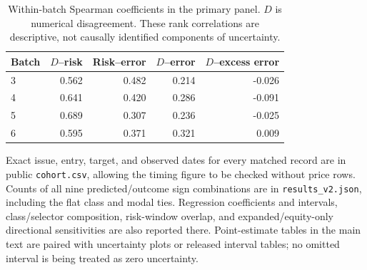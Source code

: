 \begin{table}[H]\centering\small

\begin{tabular}{lrrrr}\toprule

Batch & $D$--risk & Risk--error & $D$--error & $D$--excess error\\\midrule

3 & 0.562 & 0.482 & 0.214 & -0.026\\

4 & 0.641 & 0.420 & 0.286 & -0.091\\

5 & 0.689 & 0.307 & 0.236 & -0.025\\

6 & 0.595 & 0.371 & 0.321 & 0.009\\

\bottomrule\end{tabular}

\caption{Within-batch Spearman coefficients in the primary panel. $D$ is numerical disagreement. These rank correlations are descriptive, not causally identified components of uncertainty.}\end{table}

Exact issue, entry, target, and observed dates for every matched record are in public \texttt{cohort.csv}, allowing the timing figure to be checked without price rows. Counts of all nine predicted/outcome sign combinations are in \texttt{results\_v2.json}, including the flat class and modal ties. Regression coefficients and intervals, class/selector composition, risk-window overlap, and expanded/equity-only directional sensitivities are also reported there. Point-estimate tables in the main text are paired with uncertainty plots or released interval tables; no omitted interval is being treated as zero uncertainty.
